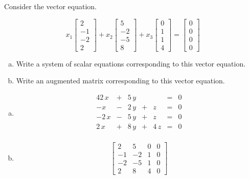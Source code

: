 
\begin{exerciseStatement}


Consider the vector equation.

\[ x_{1} \left[\begin{array}{c}
2 \\
-1 \\
-2 \\
2
\end{array}\right] + x_{2} \left[\begin{array}{c}
5 \\
-2 \\
-5 \\
8
\end{array}\right] + x_{3} \left[\begin{array}{c}
0 \\
1 \\
1 \\
4
\end{array}\right] = \left[\begin{array}{c}
0 \\
0 \\
0 \\
0
\end{array}\right] \]
\begin{enumerate}[(a)]
\item  Write a system of scalar equations corresponding to this vector equation. 
\item  Write an augmented matrix corresponding to this vector equation. 
\end{enumerate}
    
\end{exerciseStatement}
    
\begin{exerciseAnswer} 

\begin{enumerate}[(a)]
\item 
\begin{alignat*}{4} 2 \, x &+& 5 \, y & &  &=& 0 \\-x &-& 2 \, y &+& z &=& 0 \\-2 \, x &-& 5 \, y &+& z &=& 0 \\2 \, x &+& 8 \, y &+& 4 \, z &=& 0 \\ \end{alignat*}
            
\item \[ \left[\begin{array}{ccc|c}
2 & 5 & 0 & 0 \\
-1 & -2 & 1 & 0 \\
-2 & -5 & 1 & 0 \\
2 & 8 & 4 & 0
\end{array}\right] \]
\end{enumerate}
    
\end{exerciseAnswer}
    

